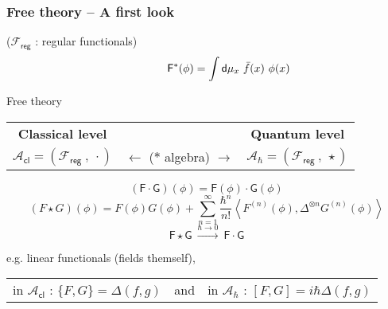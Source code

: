 \documentclass[9pt]{beamer}
\newcommand{\sm}[1]{\left\langle #1 \right\rangle}
\newcommand{\Acal}{\mathcal{A}}
\newcommand{\Fcal}{\mathcal{F}}
\newcommand{\Fsf}{\mathsf{F}}
\newcommand{\Gsf}{\mathsf{G}}
\newcommand{\dsf}{\mathsf{d}}
\begin{document}
\begin{frame}
\frametitle{Free theory -- A first look}
  
\vfill  
  
($\Fcal_\mathsf{reg}$ : regular functionals)
\vspace*{-27.5pt}
\begin{equation*}
\hspace*{40pt} \Fsf^\ast(\phi) = \int \dsf\mu_x \ \bar{f}(x) \ \phi(x) 
\end{equation*}


 
\vspace*{-8pt}

\begin{block}{\center \vspace*{-14pt} Free theory}
\vspace*{-6pt}
\begin{center}
% 
\begin{tabular}{ccc}
%
\textbf{Classical level} & & \textbf{Quantum level} \\
%
$\Acal_\mathsf{cl} = \left( \Fcal_{\mathsf{reg}} \ , \ \cdot \right)$ & $\leftarrow$ ($\ast$ algebra) $\rightarrow$ & $\Acal_\hbar = \left( \Fcal_{\mathsf{reg}} \ , \ \star \right)$ 
%
\end{tabular}
%
\begin{equation*}
(\Fsf \cdot \Gsf)(\phi) = \Fsf(\phi) \cdot \Gsf(\phi) 
\end{equation*}
%
\begin{equation*}
(F \star G)(\phi) = F(\phi) G(\phi) + \sum_{n=1}^\infty \frac{\hbar^n}{n!} \sm{F^{(n)}(\phi), \Delta^{\otimes n} G^{(n)}(\phi)} 
\end{equation*}
%
\begin{equation*}
\Fsf \star \Gsf \ \overset{\hbar \to 0}{\longrightarrow} \ \Fsf \cdot \Gsf
\end{equation*}
%
\end{center}
%
\end{block}

\vfill

e.g. linear functionals (fields themself), 
\begin{tabular}{lcl}
in $\Acal_\mathsf{cl}$ : $\{F,G\} = \Delta(f,g)$ & and & in $\Acal_\hbar$ : $[F,G] = i \hbar \Delta(f,g)$ 
\end{tabular}

\vfill

\end{frame}
\end{document}
